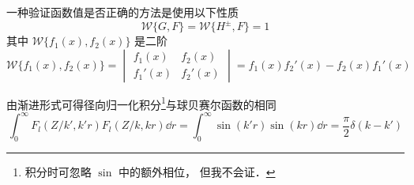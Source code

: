 一种验证函数值是否正确的方法是使用以下性质
\begin{equation}
\mathcal{W}\{G, F\} = \mathcal{W}\{H^\pm, F\} = 1
\end{equation}
其中 $\mathcal{W}\{f_1(x), f_2(x)\}$ 是二阶
\begin{equation}
\mathcal{W}\{f_1(x), f_2(x)\} = \begin{vmatrix}
f_1(x)  & f_2(x) \\
f_1'(x) & f_2'(x)
\end{vmatrix} = f_1(x) f_2'(x) - f_2(x) f_1'(x)
\end{equation}


由渐进形式可得径向归一化积分\footnote{积分时可忽略 $\sin$ 中的额外相位， 但我不会证．}与球贝赛尔函数的相同
\begin{equation}
\int_0^\infty F_l(Z/k', k' r)F_l(Z/k, kr) \dd{r} = \int_0^\infty \sin(k'r)\sin(kr) \dd{r} = \frac{\pi}{2}\delta(k - k')
\end{equation}